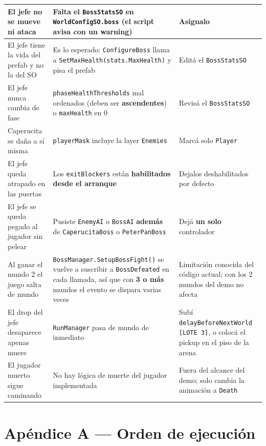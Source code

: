 \documentclass[a4paper,12pt]{article}
\newcommand{\code}[1]{\texttt{#1}}
\begin{document}
\begin{center}
\begin{longtable}{|p{4.2cm}|p{4.6cm}|p{5.4cm}|}
\hline
El jefe no se mueve ni ataca & Falta el \code{BossStatsSO} en \code{WorldConfigSO.boss} (el script avisa con un warning) & Asignalo \\
\hline
El jefe tiene la vida del prefab y no la del SO & Es lo esperado: \code{ConfigureBoss} llama a \code{SetMaxHealth(stats.MaxHealth)} y pisa el prefab & Editá el \code{BossStatsSO} \\
\hline
El jefe nunca cambia de fase & \code{phaseHealthThresholds} mal ordenados (deben ser \textbf{ascendentes}) o \code{maxHealth} en 0 & Revisá el \code{BossStatsSO} \\
\hline
Caperucita se daña a sí misma & \code{playerMask} incluye la layer \code{Enemies} & Marcá solo \code{Player} \\
\hline
El jefe queda atrapado en las puertas & Los \code{exitBlockers} están \textbf{habilitados desde el arranque} & Dejalos deshabilitados por defecto \\
\hline
El jefe se queda pegado al jugador sin pelear & Pusiste \code{EnemyAI} o \code{BossAI} \textbf{además} de \code{CaperucitaBoss} o \code{PeterPanBoss} & Dejá \textbf{un solo} controlador \\
\hline
Al ganar el mundo 2 el juego salta de mundo & \code{BossManager.SetupBossFight()} se vuelve a suscribir a \code{BossDefeated} en cada llamada, así que con \textbf{3 o más} mundos el evento se dispara varias veces & Limitación conocida del código actual; con los 2 mundos del demo no afecta \\
\hline
El drop del jefe desaparece apenas muere & \code{RunManager} pasa de mundo de inmediato & Subí \code{delayBeforeNextWorld} \code{[LOTE 3]}, o colocá el pickup en el piso de la arena \\
\hline
El jugador muerto sigue caminando & No hay lógica de muerte del jugador implementada & Fuera del alcance del demo; solo cambia la animación a \code{Death} \\
\hline
\end{longtable}
\end{center}

\section{Apéndice A --- Orden de ejecución}
\end{document}
